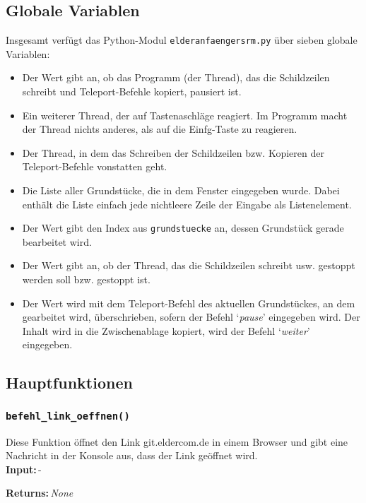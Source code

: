 \documentclass{article}
\newcommand{\initem}[2]{\item[\hspace{0.5em} {\normalfont\ttfamily{#1}} {\normalfont\itshape{(#2)}}]}
\newcommand{\bfpara}[1]{\noindent \textbf{#1:}\,}
\begin{document}
\subsection{Globale Variablen}\label{subsec:globale_variablen}
Insgesamt verf\"ugt das Python-Modul \texttt{elderanfaengersrm.py} \"uber sieben globale Variablen:
\begin{itemize}
	\initem{pause}{bool} Der Wert gibt an, ob das Programm (der Thread), das die Schildzeilen schreibt und Teleport-Befehle kopiert, pausiert ist.
	\initem{listener}{pynput.keyboard.Listener} Ein weiterer Thread, der auf Tastenaschl\"age reagiert. Im Programm macht der Thread nichts anderes, als auf die Einfg-Taste zu reagieren.
	\initem{kopier\_thread}{threading.Thread} Der Thread, in dem das Schreiben der Schildzeilen bzw. Kopieren der Teleport-Befehle vonstatten geht.
	\initem{grundstuecke}{list} Die Liste aller Grundst\"ucke, die in dem Fenster eingegeben wurde. Dabei enth\"alt die Liste einfach jede nichtleere Zeile der Eingabe als Listenelement.
	\initem{index}{int} Der Wert gibt den Index aus \texttt{grundstuecke} an, dessen Grundst\"uck gerade bearbeitet wird.
	\initem{stop}{bool} Der Wert gibt an, ob der Thread, das die Schildzeilen schreibt usw. gestoppt werden soll bzw. gestoppt ist.
	\initem{interne\_clipboard}{str} Der Wert wird mit dem Teleport-Befehl des aktuellen Grundst\"uckes, an dem gearbeitet wird, \"uberschrieben, sofern der Befehl `\textit{pause}' eingegeben wird. Der Inhalt wird in die Zwischenablage kopiert, wird der Befehl `\textit{weiter}' eingegeben.\\[22pt]
\end{itemize}


\subsection{Hauptfunktionen}

\subsubsection*{\texttt{befehl\_link\_oeffnen()}}
Diese Funktion \"offnet den Link git.eldercom.de in einem Browser und gibt eine Nachricht in der Konsole aus, dass der Link ge\"offnet wird.\\

\bfpara{Input}-

\bfpara{Returns}\textit{None}\\[11pt]
\end{document}
